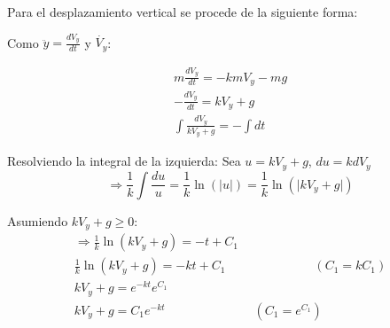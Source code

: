 Para el desplazamiento vertical se procede de la siguiente forma:

Como $\ddot{y}=\frac{dV_{y}}{dt}$ y $\dot{V_{y}}$:

\begin{gather*}
    m\frac{dV_{y}}{dt} = -kmV_{y}-mg\\
    -\frac{dV_{y}}{dt} = kV_{y}+g\\
    \int \frac{dV_{y}}{kV_{y}+g} = -\int dt
\end{gather*}

Resolviendo la integral de la izquierda:
Sea $u=kV_{y}+g$, $du=kdV_{y}$
\begin{equation*}
    \Rightarrow \frac{1}{k} \int \frac{du}{u} = \frac{1}{k} \ln(\lvert u \rvert) = \frac{1}{k} \ln(\lvert kV_{y}+g \rvert)
\end{equation*}

Asumiendo $kV_{y}+g \geq 0$:
\begin{gather*}
    \Rightarrow \frac{1}{k} \ln(kV_{y}+g) = -t+C_{1}\\
    \frac{1}{k} \ln(kV_{y}+g) = -kt+C_{1} \hspace{3cm} (C_{1}=kC_{1})\\
    kV_{y}+g = e^{-kt}e^{C_{1}}\\
    kV_{y}+g = C_{1}e^{-kt} \hspace{3cm} (C_{1}=e^{C_{1}})
\end{gather*}